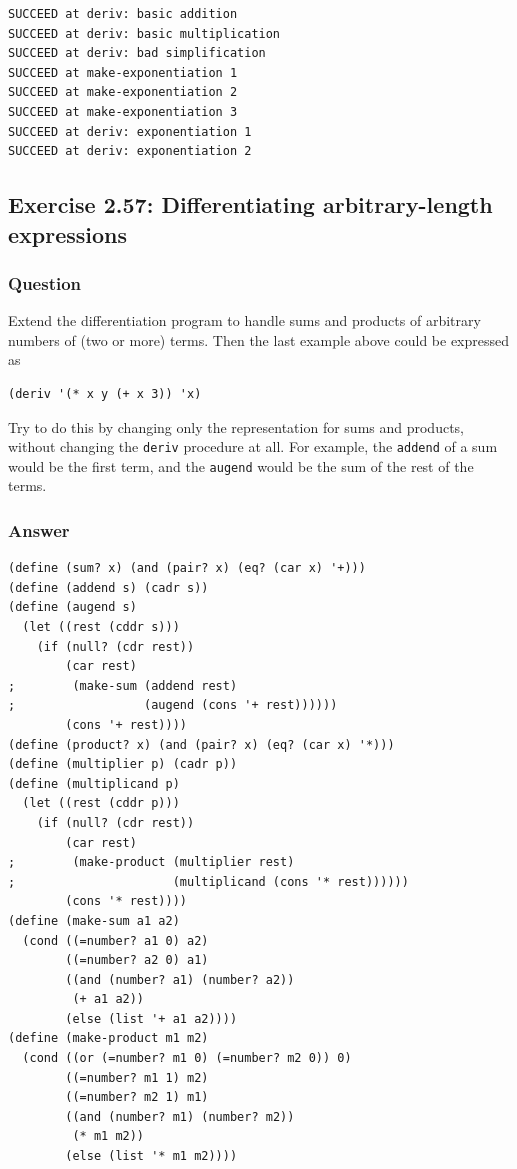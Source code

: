 \documentclass[final,fleqn,titlepage,twoside]{article}
\begin{document}
\begin{verbatim}
SUCCEED at deriv: basic addition
SUCCEED at deriv: basic multiplication
SUCCEED at deriv: bad simplification
SUCCEED at make-exponentiation 1
SUCCEED at make-exponentiation 2
SUCCEED at make-exponentiation 3
SUCCEED at deriv: exponentiation 1
SUCCEED at deriv: exponentiation 2
\end{verbatim}

\subsection{Exercise 2.57: Differentiating arbitrary-length expressions}
\label{sec:org1bcf129}
\subsubsection{Question}
\label{sec:org807dc0e}
Extend the differentiation program to handle sums and products of arbitrary
numbers of (two or more) terms. Then the last example above could be expressed
as

\begin{verbatim}
(deriv '(* x y (+ x 3)) 'x)
\end{verbatim}

Try to do this by changing only the representation for sums and products,
without changing the \texttt{deriv} procedure at all. For example, the
\texttt{addend} of a sum would be the first term, and the \texttt{augend}
would be the sum of the rest of the terms.

\subsubsection{Answer}
\label{sec:org7a1f890}
\begin{verbatim}
(define (sum? x) (and (pair? x) (eq? (car x) '+)))
(define (addend s) (cadr s))
(define (augend s)
  (let ((rest (cddr s)))
    (if (null? (cdr rest))
        (car rest)
;        (make-sum (addend rest)
;                  (augend (cons '+ rest))))))
        (cons '+ rest))))
(define (product? x) (and (pair? x) (eq? (car x) '*)))
(define (multiplier p) (cadr p))
(define (multiplicand p)
  (let ((rest (cddr p)))
    (if (null? (cdr rest))
        (car rest)
;        (make-product (multiplier rest)
;                      (multiplicand (cons '* rest))))))
        (cons '* rest))))
(define (make-sum a1 a2)
  (cond ((=number? a1 0) a2)
        ((=number? a2 0) a1)
        ((and (number? a1) (number? a2))
         (+ a1 a2))
        (else (list '+ a1 a2))))
(define (make-product m1 m2)
  (cond ((or (=number? m1 0) (=number? m2 0)) 0)
        ((=number? m1 1) m2)
        ((=number? m2 1) m1)
        ((and (number? m1) (number? m2))
         (* m1 m2))
        (else (list '* m1 m2))))
\end{verbatim}
\end{document}

